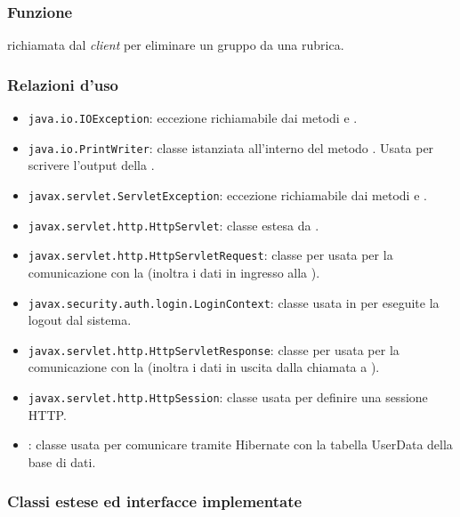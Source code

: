 

\subsubsection*{Funzione}
 richiamata dal \textit{client} per eliminare un gruppo da una rubrica.

\subsubsection*{Relazioni d'uso}

\begin{itemize}
	\item \texttt{java.io.IOException}: eccezione richiamabile dai metodi  e .
	\item \texttt{java.io.PrintWriter}: classe istanziata all'interno del metodo . Usata per scrivere l'output della .
	\item \texttt{javax.servlet.ServletException}: eccezione richiamabile dai metodi  e .
	\item \texttt{javax.servlet.http.HttpServlet}: classe estesa da .
	\item \texttt{javax.servlet.http.HttpServletRequest}:  classe per usata per la comunicazione con la  (inoltra i dati in ingresso alla ).
	\item \texttt{javax.security.auth.login.LoginContext}: classe usata in  per eseguite la logout dal sistema.
	\item \texttt{javax.servlet.http.HttpServletResponse}: classe per usata per la comunicazione con la  (inoltra i dati in uscita dalla chiamata a ).
	\item \texttt{javax.servlet.http.HttpSession}: classe usata per definire una sessione HTTP.
	\item {}: classe usata per comunicare tramite Hibernate con la tabella UserData della base di dati.
\end{itemize}

\subsubsection*{Classi estese ed interfacce implementate}

